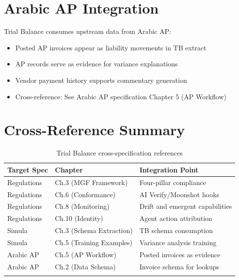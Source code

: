 \section{Arabic AP Integration}
\label{sec:arabic-integration}

Trial Balance consumes upstream data from Arabic AP:

\begin{itemize}
  \item Posted AP invoices appear as liability movements in TB extract
  \item AP records serve as evidence for variance explanations
  \item Vendor payment history supports commentary generation
  \item Cross-reference: See Arabic AP specification Chapter 5 (AP Workflow)
\end{itemize}

\section{Cross-Reference Summary}
\label{sec:xref-summary}

\begin{longtable}{@{}p{3.5cm}p{4cm}p{5cm}@{}}
\toprule
\textbf{Target Spec} & \textbf{Chapter} & \textbf{Integration Point} \\
\midrule
\endhead
Regulations & Ch.3 (MGF Framework) & Four-pillar compliance \\
Regulations & Ch.6 (Conformance) & AI Verify/Moonshot hooks \\
Regulations & Ch.8 (Monitoring) & Drift and emergent capabilities \\
Regulations & Ch.10 (Identity) & Agent action attribution \\
\midrule
Simula & Ch.3 (Schema Extraction) & TB schema consumption \\
Simula & Ch.5 (Training Examples) & Variance analysis training \\
\midrule
Arabic AP & Ch.5 (AP Workflow) & Posted invoices as evidence \\
Arabic AP & Ch.2 (Data Schema) & Invoice schema for lookups \\
\bottomrule
\caption{Trial Balance cross-specification references}
\end{longtable}